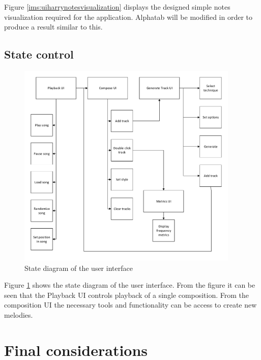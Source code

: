 Figure \ref{ims:uiharrynotesvisualization} displays the designed simple notes visualization required for the application. Alphatab will be modified in order to produce a result similar to this.





\section{State control}

\begin{figure}
\centerline{\includegraphics[width=400px]{../images/ui_control_blockdiagram.pdf}}
\caption{State diagram of the user interface}
\label{ims:uiflow}
\end{figure}

Figure \ref{ims:uiflow} shows the state diagram of the user interface. 
From the figure it can be seen that the Playback UI controls playback of a single composition. From the composition UI the necessary tools and functionality can be access to create new melodies.


\chapter{Final considerations}